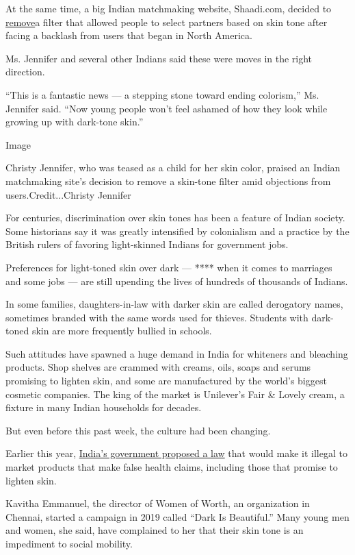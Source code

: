 At the same time, a big Indian matchmaking website, Shaadi.com, decided
to
\href{https://www.fox5ny.com/news/dating-site-removes-filter-that-allowed-users-to-sort-matches-by-skin-tone?utm_campaign=snd-autopilot}{remove}a
filter that allowed people to select partners based on skin tone after
facing a backlash from users that began in North America.

Ms. Jennifer and several other Indians said these were moves in the
right direction.

``This is a fantastic news --- a stepping stone toward ending
colorism,'' Ms. Jennifer said. ``Now young people won't feel ashamed of
how they look while growing up with dark-tone skin.''

Image

Christy Jennifer, who was teased as a child for her skin color, praised
an Indian matchmaking site's decision to remove a skin-tone filter amid
objections from users.Credit...Christy Jennifer

For centuries, discrimination over skin tones has been a feature of
Indian society. Some historians say it was greatly intensified by
colonialism and a practice by the British rulers of favoring
light-skinned Indians for government jobs.

Preferences for light-toned skin over dark --- **** when it comes to
marriages and some jobs --- are still upending the lives of hundreds of
thousands of Indians.

In some families, daughters-in-law with darker skin are called
derogatory names, sometimes branded with the same words used for
thieves. Students with dark-toned skin are more frequently bullied in
schools.

Such attitudes have spawned a huge demand in India for whiteners and
bleaching products. Shop shelves are crammed with creams, oils, soaps
and serums promising to lighten skin, and some are manufactured by the
world's biggest cosmetic companies. The king of the market is Unilever's
Fair \& Lovely cream, a fixture in many Indian households for decades.

But even before this past week, the culture had been changing.

Earlier this year,
\href{https://main.mohfw.gov.in/sites/default/files/Draft\%20of\%20the\%20Drugs\%20and\%20Magic\%20Remedies.pdf}{India's
government proposed a law} that would make it illegal to market products
that make false health claims, including those that promise to lighten
skin.

Kavitha Emmanuel, the director of Women of Worth, an organization in
Chennai, started a campaign in 2019 called ``Dark Is Beautiful.'' Many
young men and women, she said, have complained to her that their skin
tone is an impediment to social mobility.


